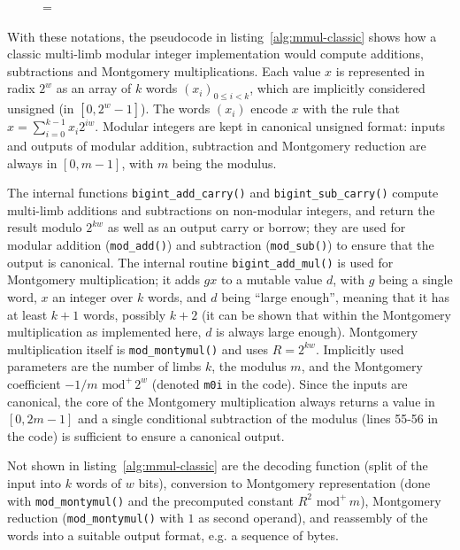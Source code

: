 \documentclass{llncs}
\newenvironment{forbidpagebreak}
    {\par\nobreak\vfil\penalty 0\vfilneg
     \vtop\bgroup}
    {\par\xdef\tpd{\the\prevdepth}\egroup
     \prevdepth=\tpd}
\newcommand{\umod}[2]{#1 \,\,\text{mod}^{+}\, #2}
\begin{document}
\begin{figure}
\begin{forbidpagebreak}

\end{forbidpagebreak}
\end{figure}

With these notations, the pseudocode in listing~\ref{alg:mmul-classic}
shows how a classic multi-limb modular integer implementation would
compute additions, subtractions and Montgomery multiplications. Each
value $x$ is represented in radix $2^w$ as an array of $k$ words
$(x_i)_{0\leq i < k}$, which are implicitly considered unsigned (in
$[0, 2^w - 1]$). The words $(x_i)$ encode $x$ with the rule that
$x = \sum_{i=0}^{k-1} x_i 2^{iw}$. Modular integers are kept in
canonical unsigned format: inputs and outputs of modular addition,
subtraction and Montgomery reduction are always in $[0, m - 1]$, with
$m$ being the modulus.

The internal functions \verb+bigint_add_carry()+ and
\verb+bigint_sub_carry()+ compute multi-limb additions and subtractions
on non-modular integers, and return the result modulo $2^{kw}$ as well
as an output carry or borrow; they are used for modular addition
(\verb+mod_add()+) and subtraction (\verb+mod_sub()+) to ensure that the
output is canonical. The internal routine \verb+bigint_add_mul()+ is
used for Montgomery multiplication; it adds $gx$ to a mutable value $d$,
with $g$ being a single word, $x$ an integer over $k$ words, and $d$
being ``large enough'', meaning that it has at least $k+1$ words,
possibly $k+2$ (it can be shown that within the Montgomery
multiplication as implemented here, $d$ is always large enough).
Montgomery multiplication itself is \verb+mod_montymul()+ and uses $R =
2^{kw}$. Implicitly used parameters are the number of limbs $k$, the
modulus $m$, and the Montgomery coefficient $\umod{-1/m}{2^w}$ (denoted
\verb+m0i+ in the code). Since the inputs are canonical, the core of the
Montgomery multiplication always returns a value in $[0, 2m - 1]$ and
a single conditional subtraction of the modulus (lines 55-56 in the code)
is sufficient to ensure a canonical output.

Not shown in listing~\ref{alg:mmul-classic} are the decoding function
(split of the input into $k$ words of $w$ bits), conversion to
Montgomery representation (done with \verb+mod_montymul()+ and the
precomputed constant $\umod{R^2}{m}$), Montgomery reduction
(\verb+mod_montymul()+ with $1$ as second operand), and reassembly of
the words into a suitable output format, e.g. a sequence of bytes.
\end{document}
